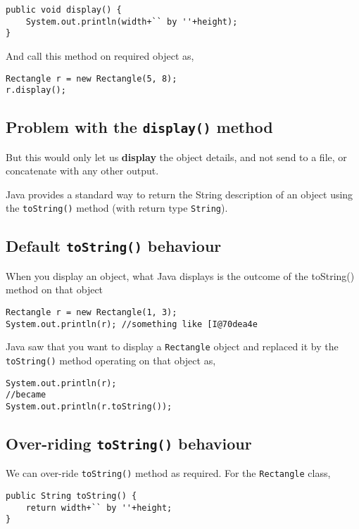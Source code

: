 \documentclass[abstracton]{scrartcl}
\begin{document}
\begin{lstlisting}
public void display() {
    System.out.println(width+`` by ''+height);
}
\end{lstlisting}

And call this method on required object as,

\begin{lstlisting}
Rectangle r = new Rectangle(5, 8);
r.display();
\end{lstlisting}

\subsection{Problem with the \texttt{display()} method}

But this would only let us \textbf{display} the object details, and not send to a file, or concatenate with any other output. 

Java provides a standard way to return the String description of an object using the \texttt{toString()} method (with return type \texttt{String}). 

\subsection{Default \texttt{toString()} behaviour}

When you display an object, what Java displays is the outcome of the {toString()} method on that object
\begin{lstlisting}
Rectangle r = new Rectangle(1, 3);
System.out.println(r); //something like [I@70dea4e
\end{lstlisting}

Java saw that you want to display a \texttt{Rectangle} object and replaced it by the \texttt{toString()} method operating on that object as,

\begin{lstlisting}
System.out.println(r);
//became
System.out.println(r.toString()); 
\end{lstlisting}

\subsection{Over-riding \texttt{toString()} behaviour}

We can over-ride \texttt{toString()} method as required. For the \texttt{Rectangle} class,

\begin{lstlisting}
public String toString() {
    return width+`` by ''+height;
}
\end{lstlisting}
\end{document}
